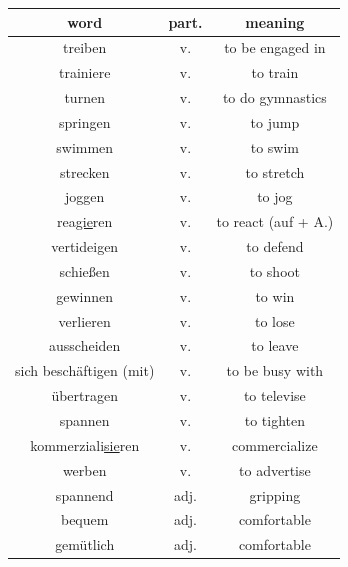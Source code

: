 \begin{center}
    \begin{tabular}{|c|c|c|}
        \hline
        \rowcolor{gray}
        word                          & part. & meaning             \\
        \hline
        treiben                       & v.    & to be engaged in    \\
        trainiere                     & v.    & to train            \\
        turnen                        & v.    & to do gymnastics    \\
        springen                      & v.    & to jump             \\
        swimmen                       & v.    & to swim             \\
        strecken                      & v.    & to stretch          \\
        joggen                        & v.    & to jog              \\
        rea\underline{gie}ren         & v.    & to react (auf + A.) \\
        vertideigen                   & v.    & to defend           \\
        schießen                      & v.    & to shoot            \\
        \hline
        gewinnen                      & v.    & to win              \\
        verlieren                     & v.    & to lose             \\
        ausscheiden                   & v.    & to leave            \\
        \hline
        sich beschäftigen (mit)       & v.    & to be busy with     \\
        \hline
        übertragen                    & v.    & to televise         \\
        spannen                       & v.    & to tighten          \\
        kommerziali\underline{sie}ren & v.    & commercialize       \\
        werben                        & v.    & to advertise        \\
        \hline
        spannend                      & adj.  & gripping            \\
        bequem                        & adj.  & comfortable         \\
        gemütlich                     & adj.  & comfortable         \\
        \hline
    \end{tabular}
\end{center}

